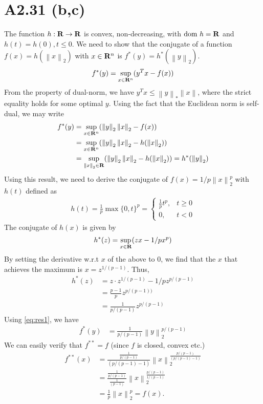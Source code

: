\documentclass[a4paper,10pt]{article}
\def\bR{{\bf R}}
\newcommand{\norm}[1]{\left\lVert#1\right\rVert}
\begin{document}
\section*{A2.31 (b,c)}
The function $h: \bR \rightarrow \bR$ is convex, non-decreasing, with $\text{dom } h = \bR$ and $h(t) = h(0), t \le 0$. We need to show that the conjugate of a function $f(x) = h(\norm{x}_2)$ with  $x \in \bR^n$ is $f^*(y) = h^*(\norm{y}_2)$.
\begin{align*}
f^*(y) = \sup_{x \in \bR^n} (y^T x - f(x))
\end{align*}
From the property of dual-norm, we have $y^T x \le \norm{y}_* \norm{x}$, where the strict equality holds for some optimal $y$. Using the fact that the Euclidean norm is self-dual, we may write
\begin{align}
f^*(y) &= \sup_{x \in \bR^n} ( \norm{y}_2 \norm{x}_2 - f(x)) \nonumber \\
&=  \sup_{x \in \bR^n} ( \norm{y}_2 \norm{x}_2 - h(\norm{x}_2)) \nonumber \\
&=  \sup_{\norm{x}_2 \in \bR } ( \norm{y}_2 \norm{x}_2 - h(\norm{x}_2)) = h^*( \norm{y}_2)
\label{eq:res1}
\end{align}
Using this result, we need to derive the conjugate of $f(x) = 1/p \norm{x}_2^p$ with $h(t)$ defined as
\begin{align*}
h(t) = \frac{1}{p} \max\{0,t\}^p = \begin{cases}
\frac{1}{p} t^p, & t \ge 0 \\
0, & t < 0
\end{cases}
\end{align*}
The conjugate of $h(x)$ is given by
\begin{align*}
h^*(z) = \sup_{x \in \bR} (zx - 1/p x^p)
\end{align*}
By setting the derivative w.r.t $x$ of the above to 0, we find that the $x$ that achieves the maximum is $x = z^{1/(p-1)}$. Thus,
\begin{align*}
h^*(z) &= z\cdot  z^{1/(p-1)}- 1/p z^{p/(p-1)} \\
&=  \frac{p-1}{p} z^{p/(p-1))} \\
&=  \frac{1}{p/(p-1)} z^{p/(p-1)}
\end{align*}
Using \ref{eq:res1}, we have
\begin{align}
f^*(y) &= \frac{1}{p/(p-1)} \norm{y}_2^{p/(p-1)}
\end{align}
We can easily verify that $f^{**} = f$ (since $f$ is closed, convex etc.)
\begin{align*}
f^{**}(x) &= \frac{\frac{1}{p/(p-1)}}{(p/(p-1) - 1)} \norm{x}_2^{\frac{p/(p-1)}{(p/(p-1) - 1)}} \\
&= \frac{\frac{1}{p/(p-1)}}{\frac{1}{(p-1)}} \norm{x}_2^{\frac{p/(p-1)}{1/(p-1)}} \\
&= \frac{1}{p} \norm{x}_2^p = f(x).
\end{align*}
\end{document}
